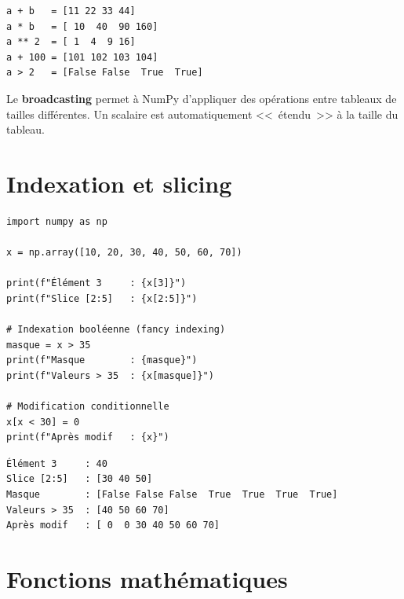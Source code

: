 \begin{codeoutput}
\begin{verbatim}
a + b   = [11 22 33 44]
a * b   = [ 10  40  90 160]
a ** 2  = [ 1  4  9 16]
a + 100 = [101 102 103 104]
a > 2   = [False False  True  True]
\end{verbatim}
\end{codeoutput}

\begin{definition}[Broadcasting]
Le \textbf{broadcasting} permet \`a NumPy d'appliquer des op\'erations
entre tableaux de tailles diff\'erentes. Un scalaire est automatiquement
<<~\'etendu~>> \`a la taille du tableau.
\end{definition}

\section{Indexation et slicing}

\begin{codeblock}[title=\textbf{Python}]
\begin{verbatim}
import numpy as np

x = np.array([10, 20, 30, 40, 50, 60, 70])

print(f"Élément 3     : {x[3]}")
print(f"Slice [2:5]   : {x[2:5]}")

# Indexation booléenne (fancy indexing)
masque = x > 35
print(f"Masque        : {masque}")
print(f"Valeurs > 35  : {x[masque]}")

# Modification conditionnelle
x[x < 30] = 0
print(f"Après modif   : {x}")
\end{verbatim}
\end{codeblock}

\begin{codeoutput}
\begin{verbatim}
Élément 3     : 40
Slice [2:5]   : [30 40 50]
Masque        : [False False False  True  True  True  True]
Valeurs > 35  : [40 50 60 70]
Après modif   : [ 0  0 30 40 50 60 70]
\end{verbatim}
\end{codeoutput}

\section{Fonctions math\'ematiques}

